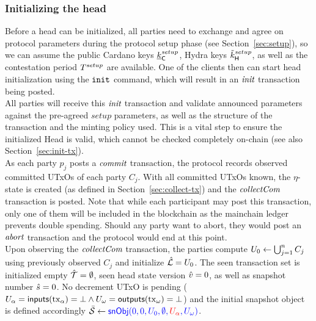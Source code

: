 \subsubsection{Initializing the head}

\quad Before a head can be initialized, all parties need
to exchange and agree on protocol parameters during the protocol setup phase
(see Section~\ref{sec:setup}), so we can assume the public Cardano keys
$\underline{k}_\mathsf{C}^{setup}$, Hydra keys $\tilde{k}_{\mathsf{H}}^{setup}$, as well as the
contestation period $T^{setup}$ are available. One of the clients then can
start head initialization using the $\mathtt{init}$ command, which will result in an
$\textit{init}$ transaction being posted. \\

\quad All parties will receive this $\textit{init}$
transaction and validate announced parameters against the pre-agreed $setup$
parameters, as well as the structure of the transaction and the minting policy
used. This is a vital step to ensure the initialized Head is valid, which
cannot be checked completely on-chain (see also Section~\ref{sec:init-tx}). \\

\quad As each party $p_{j}$ posts a
$\textit{commit}$ transaction, the protocol records observed committed UTxOs of each
party $C_j$. With all committed UTxOs known, the $\eta$-state is created (as
defined in Section~\ref{sec:collect-tx}) and the $\textit{collectCom}$ transaction is
posted. Note that while each participant may post this transaction, only one of
them will be included in the blockchain as the mainchain ledger prevents double
spending. Should any party want to abort, they would post an $\textit{abort}$
transaction and the protocol would end at this point.\\

\quad Upon observing the $\textit{collectCom}$
transaction, the parties compute $U_{0} \gets \bigcup_{j=1}^{n} C_j$ using previously
observed $C_j$ and initialize $\hat {\mathcal L} = U_{0}$. The seen transaction set is
initialized empty $\hat {\mathcal T} = \emptyset$, seen head state version $\hat v = 0$, as
well as snapshot number $\hat s = 0$. No decrement UTxO is pending
($U_\alpha = \mathsf{inputs}(\mathrm{tx}_\alpha) = \bot \land U_\omega = \mathsf{outputs}(\mathrm{tx}_\omega) = \bot$)
and the initial snapshot object is defined accordingly
$\bar{\mathcal S} \gets \textcolor{blue}{\mathsf{snObj}(0, 0, U_{0}, \emptyset, \textcolor{red}{U_\alpha}, U_\omega)}$.

